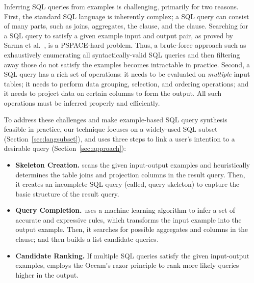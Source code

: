 Inferring SQL queries from examples is challenging,
primarily for two reasons. First, the standard SQL
language is inherently complex; a SQL query can consist
of many parts, such as joins, aggregates,
the  clause, and the  clause.
Searching for a SQL query
to satisfy a given example input and output pair,
as proved by Sarma et al.~\cite{DasSarma:2010},
is a PSPACE-hard problem. Thus,
a brute-force approach such as exhaustively
enumerating all
syntactically-valid SQL queries and then
filtering away those do not satisfy the examples
becomes intractable in practice. 
Second, a SQL query has a rich set of operations: it
needs to be evaluated on \textit{multiple} input tables;
it needs to perform data grouping, selection, and ordering
operations; and it needs to project data on certain columns to
form the output.
All such operations must be inferred properly and efficiently.%


To address these challenges and make example-based
SQL query synthesis feasible in practice,
our \ourtool technique focuses on a widely-used SQL subset (Section~\ref{sec:langsubset}),
and uses three steps to link a user's intention to
a desirable query (Section~\ref{sec:approach}):



\begin{itemize}
\item \textbf{Skeleton Creation.} \ourtool scans the
given input-output examples and heuristically
determines the table joins and projection columns in
the result query. Then, it creates an
incomplete SQL query (called, query skeleton) to
capture the basic structure of the result query.

\item \textbf{Query Completion.} \ourtool
uses a machine learning algorithm to infer a set of accurate
and expressive rules, which transforms the input
example into the output example. Then, it
searches for possible aggregates and columns in
the  clause; and then
builds a list candidate queries. 


\item \textbf{Candidate Ranking.} If multiple SQL
queries satisfy the given input-output examples,
\ourtool employs the Occam's razor principle to
rank more likely queries higher in the output.
\end{itemize}

